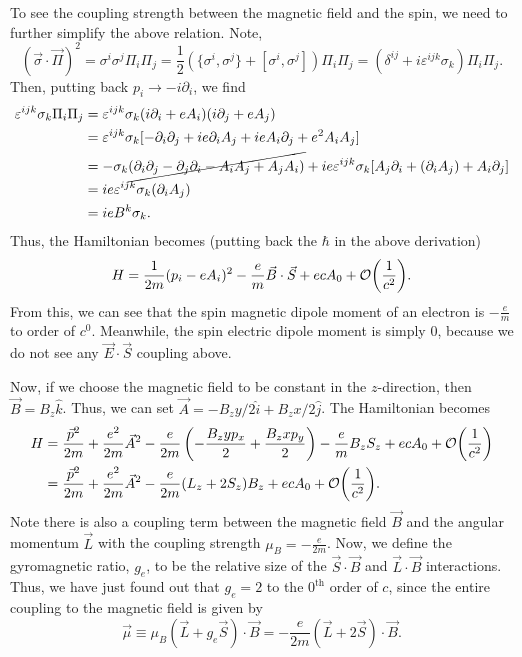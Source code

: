 \documentclass[11pt]{article}
\theoremstyle{definition}
\begin{document}
To see the coupling strength between the magnetic field and the spin, we need to further simplify the above relation. Note,
\begin{equation}
    (\vec{\sigma}\cdot\vec{\Pi})^2 = \sigma^i\sigma^j\Pi_i\Pi_j = \frac{1}{2}(\{\sigma^i,\sigma^j\} + [\sigma^i,\sigma^j])\Pi_i\Pi_j = (\delta^{ij}+i\varepsilon^{ijk}\sigma_k)\Pi_i\Pi_j.
\end{equation}
Then, putting back $p_i \rightarrow -i\partial_i$, we find
\begin{equation}
    \begin{aligned}
        \varepsilon^{ijk}\sigma_k\Pi_i\Pi_j &= \varepsilon^{ijk}\sigma_k(i\partial_i+eA_i)(i\partial_j+eA_j)\\
        &= \varepsilon^{ijk}\sigma_k[-\partial_i\partial_j + ie\partial_iA_j + ieA_i\partial_j +e^2A_iA_j]\\
        &= -\sigma_k\cancel{(\partial_i\partial_j - \partial_j\partial_i - A_iA_j + A_jA_i)} + ie\varepsilon^{ijk}\sigma_k[A_j\partial_i + (\partial_iA_j) + A_i\partial_j]\\
        &= ie\varepsilon^{ijk}\sigma_k(\partial_iA_j)\\
        &= ieB^k\sigma_k.
    \end{aligned}
\end{equation}
Thus, the Hamiltonian becomes (putting back the $\hbar$ in the above derivation)
\begin{equation}
    H = \frac{1}{2m}(p_i-eA_i)^2 - \frac{e}{m}\vec{B}\cdot\vec{S}  + ecA_0 + \order{\frac{1}{c^2}}.
\end{equation}
From this, we can see that the spin magnetic dipole moment of an electron is $-\frac{e}{m}$ to order of $c^0$. Meanwhile, the spin electric dipole moment is simply $0$, because we do not see any $\vec{E}\cdot\vec{S}$ coupling above. 

Now, if we choose the magnetic field to be constant in the $z$-direction, then $\vec{B}=B_z\hat{k}$. Thus, we can set $\vec{A} =  -B_zy/2\hat{i} + B_zx/2\hat{j}$. The Hamiltonian becomes
\begin{equation}
    \begin{aligned}
        H &= \frac{\vec{p}^2}{2m}+\frac{e^2}{2m}\vec{A}^2 - \frac{e}{2m}\left(-\frac{B_zyp_x}{2} + \frac{B_zxp_y}{2}\right) - \frac{e}{m}B_zS_z  + ecA_0 + \order{\frac{1}{c^2}}\\
        &= \frac{\vec{p}^2}{2m}+\frac{e^2}{2m}\vec{A}^2 -\frac{e}{2m}(L_z + 2S_z)B_z + ecA_0 + \order{\frac{1}{c^2}}.
    \end{aligned}
\end{equation}
Note there is also a coupling term between the magnetic field $\vec{B}$ and the angular momentum $\vec{L}$ with the coupling strength $\mu_B = -\frac{e}{2m}$. Now, we define the gyromagnetic ratio, $g_e$, to be the relative size of the $\vec{S}\cdot\vec{B}$ and $\vec{L}\cdot\vec{B}$ interactions. Thus, we have just found out that $g_e=2$ to the $0^\text{th}$ order of $c$, since the entire coupling to the magnetic field is given by
\begin{equation}
    \vec{\mu} \equiv \mu_B(\vec{L} + g_e\vec{S})\cdot \vec{B} = -\frac{e}{2m}(\vec{L} + 2\vec{S})\cdot \vec{B}.
\end{equation}
\end{document}
